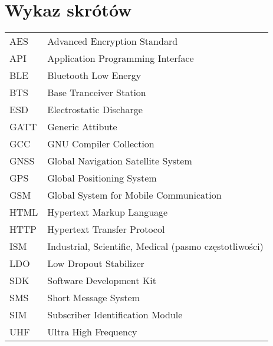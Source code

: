\chapter*{Wykaz skrótów}

\begin{tabular}{l l}
AES & Advanced Encryption Standard \\
API & Application Programming Interface \\
BLE & Bluetooth Low Energy \\
BTS & Base Tranceiver Station \\
ESD & Electrostatic Discharge \\
GATT & Generic Attibute \\
GCC & GNU Compiler Collection \\
GNSS & Global Navigation Satellite System \\
GPS & Global Positioning System \\
GSM & Global System for Mobile Communication \\
HTML & Hypertext Markup Language \\
HTTP & Hypertext Transfer Protocol \\
ISM & Industrial, Scientific, Medical (pasmo częstotliwości) \\
LDO & Low Dropout Stabilizer \\
SDK & Software Development Kit \\
SMS & Short Message System \\
SIM & Subscriber Identification Module \\
UHF & Ultra High Frequency \\




\end{tabular}
